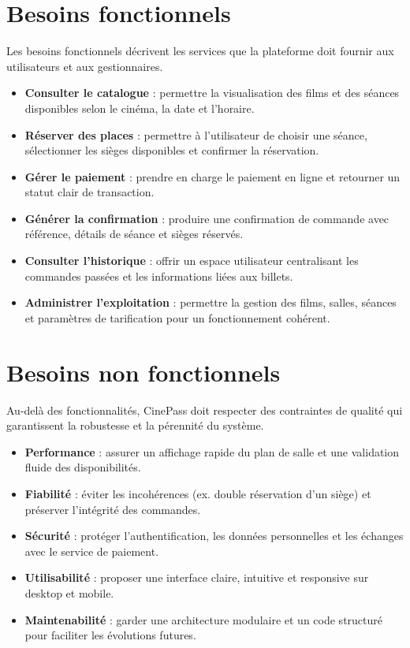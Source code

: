 \documentclass[12pt]{report}
\begin{document}
\section{Besoins fonctionnels}
Les besoins fonctionnels décrivent les services que la plateforme doit fournir aux utilisateurs et aux gestionnaires.
\begin{itemize}[leftmargin=1.2cm]
  \item \textbf{Consulter le catalogue} : permettre la visualisation des films et des séances disponibles selon le cinéma, la date et l'horaire.
  \item \textbf{Réserver des places} : permettre à l'utilisateur de choisir une séance, sélectionner les sièges disponibles et confirmer la réservation.
  \item \textbf{Gérer le paiement} : prendre en charge le paiement en ligne et retourner un statut clair de transaction.
  \item \textbf{Générer la confirmation} : produire une confirmation de commande avec référence, détails de séance et sièges réservés.
  \item \textbf{Consulter l'historique} : offrir un espace utilisateur centralisant les commandes passées et les informations liées aux billets.
  \item \textbf{Administrer l'exploitation} : permettre la gestion des films, salles, séances et paramètres de tarification pour un fonctionnement cohérent.
\end{itemize}

\section{Besoins non fonctionnels}
Au-delà des fonctionnalités, CinePass doit respecter des contraintes de qualité qui garantissent la robustesse et la pérennité du système.
\begin{itemize}[leftmargin=1.2cm]
  \item \textbf{Performance} : assurer un affichage rapide du plan de salle et une validation fluide des disponibilités.
  \item \textbf{Fiabilité} : éviter les incohérences (ex. double réservation d'un siège) et préserver l'intégrité des commandes.
  \item \textbf{Sécurité} : protéger l'authentification, les données personnelles et les échanges avec le service de paiement.
  \item \textbf{Utilisabilité} : proposer une interface claire, intuitive et responsive sur desktop et mobile.
  \item \textbf{Maintenabilité} : garder une architecture modulaire et un code structuré pour faciliter les évolutions futures.
\end{itemize}
\end{document}
